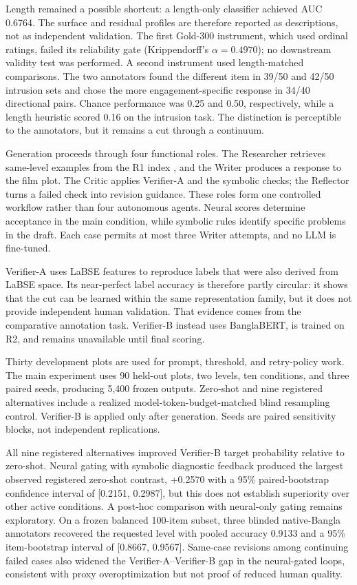 Length remained a possible shortcut: a length-only classifier achieved AUC 0.6764. The surface and residual profiles are therefore reported as descriptions, not as independent validation. The first Gold-300 instrument, which used ordinal ratings, failed its reliability gate (Krippendorff's \(\alpha=0.4970\)); no downstream validity test was performed. A second instrument used length-matched comparisons. The two annotators found the different item in 39/50 and 42/50 intrusion sets and chose the more engagement-specific response in 34/40 directional pairs. Chance performance was 0.25 and 0.50, respectively, while a length heuristic scored 0.16 on the intrusion task. The distinction is perceptible to the annotators, but it remains a cut through a continuum.

Generation proceeds through four functional roles. The Researcher retrieves same-level examples from the R1 index \cite{b8}, and the Writer produces a response to the film plot. The Critic applies Verifier-A and the symbolic checks; the Reflector turns a failed check into revision guidance. These roles form one controlled workflow rather than four autonomous agents. Neural scores determine acceptance in the main condition, while symbolic rules identify specific problems in the draft. Each case permits at most three Writer attempts, and no LLM is fine-tuned.

Verifier-A uses LaBSE features to reproduce labels that were also derived from LaBSE space. Its near-perfect label accuracy is therefore partly circular: it shows that the cut can be learned within the same representation family, but it does not provide independent human validation. That evidence comes from the comparative annotation task. Verifier-B instead uses BanglaBERT, is trained on R2, and remains unavailable until final scoring.

Thirty development plots are used for prompt, threshold, and retry-policy work. The main experiment uses 90 held-out plots, two levels, ten conditions, and three paired seeds, producing 5,400 frozen outputs. Zero-shot and nine registered alternatives include a realized model-token-budget-matched blind resampling control. Verifier-B is applied only after generation. Seeds are paired sensitivity blocks, not independent replications.

All nine registered alternatives improved Verifier-B target probability relative to zero-shot. Neural gating with symbolic diagnostic feedback produced the largest observed registered zero-shot contrast, +0.2570 with a 95\% paired-bootstrap confidence interval of [0.2151, 0.2987], but this does not establish superiority over other active conditions. A post-hoc comparison with neural-only gating remains exploratory. On a frozen balanced 100-item subset, three blinded native-Bangla annotators recovered the requested level with pooled accuracy 0.9133 and a 95\% item-bootstrap interval of [0.8667, 0.9567]. Same-case revisions among continuing failed cases also widened the Verifier-A–Verifier-B gap in the neural-gated loops, consistent with proxy overoptimization but not proof of reduced human quality.

